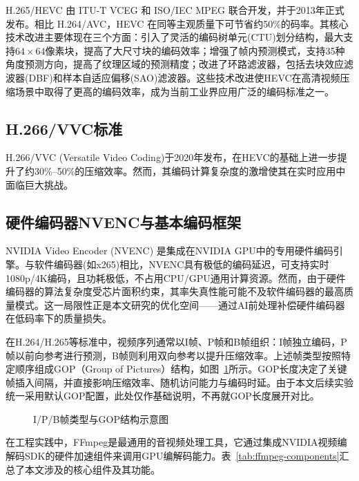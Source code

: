 H.265/\allowbreak HEVC 由 ITU-T VCEG 和 ISO/\allowbreak IEC MPEG 联合开发，并于2013年正式发布\cite{ref10-sullivan2012hevc}。相比 H.264/\allowbreak AVC\cite{ref33-wiegand2003avc}，HEVC 在同等主观质量下可节省约50\%的码率。其核心技术改进主要体现在三个方面：引入了灵活的编码树单元(CTU)划分结构，最大支持$64 \times 64$像素块，提高了大尺寸块的编码效率；增强了帧内预测模式，支持35种角度预测方向，提高了纹理区域的预测精度；改进了环路滤波器，包括去块效应滤波器(DBF)\cite{ref34-norkin2012deblocking}和样本自适应偏移(SAO)滤波器\cite{ref35-fu2012sao}。这些技术改进使HEVC在高清视频压缩场景中取得了更高的编码效率，成为当前工业界应用广泛的编码标准之一。

\subsection{H.266/VVC标准}

H.266/VVC (Versatile Video Coding)于2020年发布，在HEVC的基础上进一步提升了约30\%--50\%的压缩效率\cite{ref1-bross2021vvc}。然而，其编码计算复杂度的激增使其在实时应用中面临巨大挑战。

\subsection{硬件编码器NVENC与基本编码框架}

NVIDIA Video Encoder (NVENC) 是集成在NVIDIA GPU中的专用硬件编码引擎。与软件编码器(如x265)相比，NVENC具有极低的编码延迟，可支持实时1080p/4K编码，且功耗极低，不占用CPU/GPU通用计算资源。然而，由于硬件编码器的算法复杂度受芯片面积约束，其率失真性能可能不及软件编码器的最高质量模式。这一局限性正是本文研究的优化空间——通过AI前处理补偿硬件编码器在低码率下的质量损失。

在H.264/H.265等标准中，视频序列通常以I帧、P帧和B帧组织：I帧独立编码，P帧以前向参考进行预测，B帧则利用双向参考以提升压缩效率。上述帧类型按照特定顺序组成GOP（Group of Pictures）结构，如图~\ref{fig:ipb-gop}所示。GOP长度决定了关键帧插入间隔，并直接影响压缩效率、随机访问能力与编码时延。由于本文后续实验统一采用默认GOP配置，此处仅作基础说明，不再就GOP长度展开对比。

\begin{figure}[htbp]
  \centering
  \resizebox{0.92\textwidth}{!}{}
  \caption{I/P/B帧类型与GOP结构示意图}
  \label{fig:ipb-gop}
\end{figure}

在工程实践中，FFmpeg\cite{ref58-ffmpegproject}是最通用的音视频处理工具，它通过集成NVIDIA视频编解码SDK\cite{ref59-nvidiasdk}的硬件加速组件来调用GPU编解码能力。表~\ref{tab:ffmpeg-components}汇总了本文涉及的核心组件及其功能。

